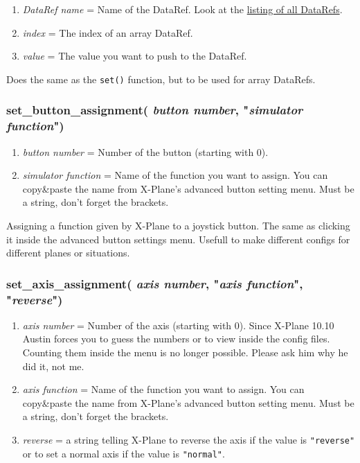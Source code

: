 \documentclass[11pt,parskip=half,a4paper]{scrartcl}
\begin{document}
\begin{enumerate}
	\item \emph{DataRef name} = Name of the DataRef. Look at the \href{http://www.xsquawkbox.net/xpsdk/docs/DataRefs.html}{listing of all DataRefs}.
	\item \emph{index} = The index of an array DataRef.
	\item \emph{value} = The value you want to push to the DataRef.
\end{enumerate}

Does the same as the \verb|set()| function, but to be used for array DataRefs.

\subsubsection{set\_button\_assignment( \emph{button number}, "\emph{simulator function}")}

\begin{enumerate}
	\item \emph{button number} = Number of the button (starting with 0).
	\item \emph{simulator function} = Name of the function you want to assign. You can copy\&paste the name from X-Plane's advanced button setting menu. Must be a string, don't forget the brackets.
\end{enumerate}

Assigning a function given by X-Plane to a joystick button. The same as clicking it inside the advanced button settings menu. Usefull to make different configs for different planes or situations.

\newpage
\subsubsection{set\_axis\_assignment( \emph{axis number}, "\emph{axis function}", "\emph{reverse}")}

\begin{enumerate}
	\item \emph{axis number} = Number of the axis (starting with 0). Since X-Plane 10.10 Austin forces you to guess the numbers or to view inside the config files. Counting them inside the menu is no longer possible. Please ask him why he did it, not me.
	\item \emph{axis function} = Name of the function you want to assign. You can copy\&paste the name from X-Plane's advanced button setting menu. Must be a string, don't forget the brackets.
	\item \emph{reverse} = a string telling X-Plane to reverse the axis if the value is \verb|"reverse"| or to set a normal axis if the value is \verb|"normal"|.
\end{enumerate}
\end{document}
